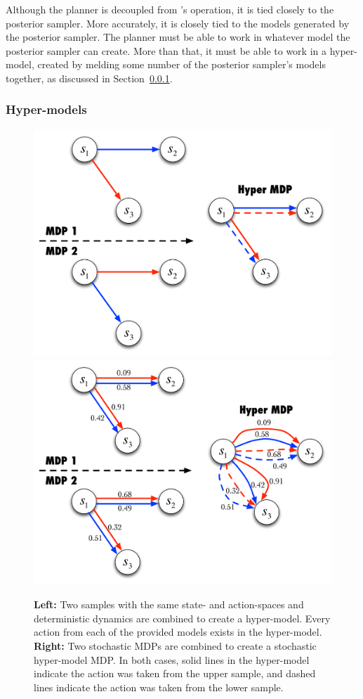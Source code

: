 Although the planner is decoupled from 's operation, it is tied closely to the posterior sampler. More accurately, it is closely tied to the models generated by the posterior sampler. The planner must be able to work in whatever model the posterior sampler can create. More than that, it must be able to work in a hyper-model, created by melding some number of the posterior sampler's models together, as discussed in Section~\ref{boss:alg:gen:hyper}.

\subsubsection{Hyper-models}

\label{boss:alg:gen:hyper}

\begin{figure}[t]
\begin{center}
\includegraphics[width=0.45\linewidth]{figures/hyper-construction}
\includegraphics[width=0.45\linewidth]{figures/hyper-stoch-construction}
\caption{\textbf{Left:} Two samples with the same state- and action-spaces and deterministic dynamics are combined to create a hyper-model. Every action from each of the provided models exists in the hyper-model. \textbf{Right:} Two stochastic MDPs are combined to create a stochastic hyper-model MDP. In both cases, solid lines in the hyper-model indicate the action was taken from the upper sample, and dashed lines indicate the action was taken from the lower sample.}
\label{sec:boss:hyper-model-creation}
\end{center}
\end{figure}


